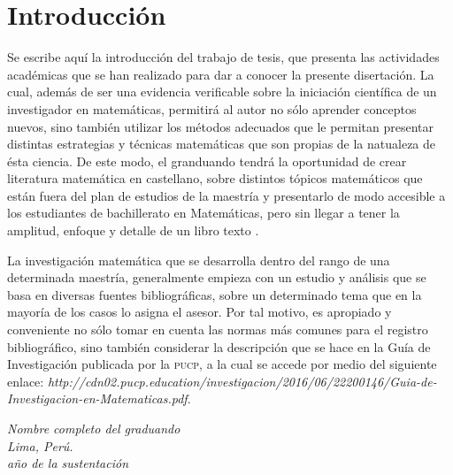 \chapter*{Introducci\'{o}n}%
 \pagestyle{plain} \setcounter{page}{1}
%
Se escribe aqu\'i la introducci\'on del trabajo de tesis, que presenta las actividades acad\'emicas que se han realizado para dar a conocer la presente disertaci\'on.
La cual, adem\'as de ser una evidencia verificable sobre la iniciaci\'on cient\'ifica de un investigador en matem\'aticas, permitir\'a al autor no s\'olo aprender conceptos nuevos, sino tambi\'en utilizar los m\'etodos adecuados que le permitan presentar distintas estrategias y t\'ecnicas matem\'aticas que son propias de la natualeza de \'esta ciencia.
De este modo, el granduando tendr\'a la oportunidad de crear literatura matem\'atica en castellano, sobre distintos t\'opicos matem\'aticos que est\'an fuera del plan de estudios de la maestr\'ia y presentarlo de modo accesible a los estudiantes de bachillerato en Matem\'aticas, pero sin llegar a tener la amplitud, enfoque y detalle de un libro texto \cite{cas2012}.
\par
La investigaci\'on matem\'atica  que se desarrolla dentro del rango de una determinada maestr\'ia, generalmente empieza con un estudio y an\'alisis que se basa en diversas fuentes bibliogr\'aficas, sobre un determinado tema que en la mayor\'ia de los casos lo asigna el asesor.
Por tal motivo, es apropiado y conveniente no s\'olo tomar en cuenta las normas m\'as comunes para el registro bibliogr\'afico, sino tambi\'en  considerar la descripci\'on que se hace en la Gu\'ia de Investigaci\'on publicada por la \textsc{pucp}, a la cual se accede por medio del siguiente enlace: \emph{http://cdn02.pucp.education/investigacion/2016/06/22200146/Guia-de-Investigacion-en-Matematicas.pdf}.

\vspace*{1.0cm}%
\begin{flushright}%
\begin{minipage}{7cm}%
\baselineskip 12pt%
\textit{\small Nombre completo del graduando\\%
Lima, Per\'u. \\%
a\~{n}o de la sustentaci\'on%
}%
\end{minipage}%
\end{flushright}%
